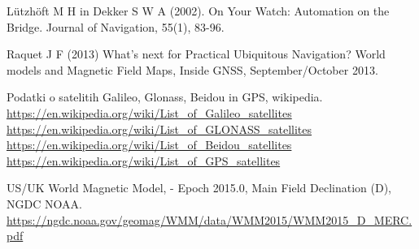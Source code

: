 \begin{thebibliography}{99.}
 Lützhöft M H in Dekker S W A (2002). On Your Watch: Automation on the Bridge. Journal of Navigation, 55(1), 83-96.

 Raquet J F (2013) What’s next for Practical Ubiquitous Navigation? World models and Magnetic Field Maps, Inside GNSS, September/October 2013.  

 Podatki o satelitih Galileo, Glonass, Beidou in GPS, wikipedia. \\
 \url{https://en.wikipedia.org/wiki/List_of_Galileo_satellites} \\
 \url{https://en.wikipedia.org/wiki/List_of_GLONASS_satellites} \\
 \url{https://en.wikipedia.org/wiki/List_of_Beidou_satellites} \\  \url{https://en.wikipedia.org/wiki/List_of_GPS_satellites} 

 US/UK World Magnetic Model, - Epoch 2015.0, Main Field Declination (D), NGDC NOAA. \\
\url{https://ngdc.noaa.gov/geomag/WMM/data/WMM2015/WMM2015_D_MERC.pdf}
 


\end{thebibliography}
